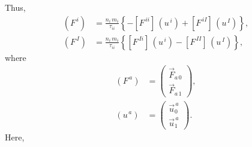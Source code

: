 \documentclass[12pt]{article}
\begin{document}
Thus, 
\begin{align}
(F^{\,i})&= \frac{n_i\,m_i}{\tau_{ii}}\left\{-\left[F^{\,ii}\right]\,(u^{\,i})+\left[F^{\,iI}\right]\,(u^{\,I})\right\},\\[0.5ex]
(F^{\,I})&= \frac{n_i\,m_i}{\tau_{ii}}\left\{\left[F^{\,Ii}\right]\,(u^{\,i})-\left[F^{\,II}\right]\,(u^{\,I})\right\},
\end{align}
where
\begin{align}
(F^{\,a})&= \left(\begin{array}{c}\vec{F}_{a\,0}\\[0.5ex]\vec{F}_{a\,1}\end{array}\right),\\[0.5ex]
(u^{\,a})&= \left(\begin{array}{c}\vec{u}^{\,a}_0\\[0.5ex]\vec{u}^{\,a}_1\end{array}\right).
\end{align}
Here,
\end{document}
